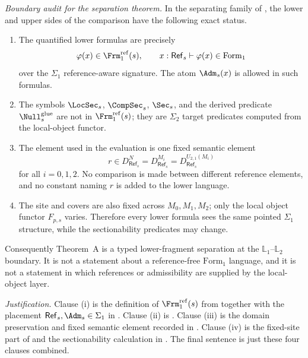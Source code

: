 \medskip
\noindent\emph{Boundary audit for the separation theorem.}
In the separating family of , the lower and upper sides of the comparison have the following exact status.
\begin{enumerate}[label=(\roman*),nosep]
\item The quantified lower formulas are precisely
\[
\varphi(x)\in\Frm_1^{\mathrm{ref}}(s),
\qquad
x:\mathsf{Ref}_s\vdash\varphi(x)\in\mathrm{Form}_1
\]
over the $\Sigma_1$ reference-aware signature. The atom $\Adm_s(x)$ is allowed in such formulas.
\item The symbols $\LocSec_s$, $\CompSec_s$, $\Sec_s$, and the derived predicate $\Null_s^{\mathrm{glue}}$ are not in $\Frm_1^{\mathrm{ref}}(s)$; they are $\Sigma_2$ target predicates computed from the local-object functor.
\item The element used in the evaluation is one fixed semantic element
\[
r\in D_{\mathsf{Ref}_s}^{N}
=D_{\mathsf{Ref}_s}^{M_i}
=D_{\mathsf{Ref}_s}^{U_{2,1}(M_i)}
\]
for all $i=0,1,2$. No comparison is made between different reference elements, and no constant naming $r$ is added to the lower language.
\item The site and covers are also fixed across $M_0,M_1,M_2$; only the local object functor $F_{p,s}$ varies. Therefore every lower formula sees the same pointed $\Sigma_1$ structure, while the sectionability predicates may change.
\end{enumerate}
Consequently Theorem~A is a typed lower-fragment separation at the $\mathbb L_1$--$\mathbb L_2$ boundary. It is not a statement about a reference-free $\mathrm{Form}_1$ language, and it is not a statement in which references or admissibility are supplied by the local-object layer.

\emph{Justification.}
Clause \textup{(i)} is the definition of $\Frm_1^{\mathrm{ref}}(s)$ from  together with the placement $\mathsf{Ref}_s,\Adm_s\in\Sigma_1$ in . Clause \textup{(ii)} is . Clause \textup{(iii)} is the domain preservation and fixed semantic element recorded in . Clause \textup{(iv)} is the fixed-site part of  and the sectionability calculation in . The final sentence is just these four clauses combined.
\medskip

